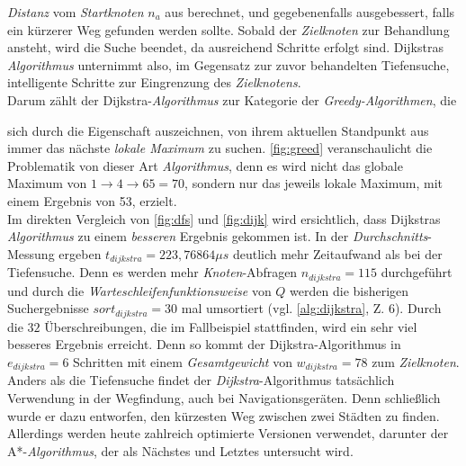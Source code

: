 \documentclass[12pt]{article}
\begin{document}
\noindent \textit{Distanz} vom \textit{Startknoten} $n_a$ aus berechnet, und gegebenenfalls ausgebessert, falls ein kürzerer Weg gefunden werden sollte. Sobald der \textit{Zielknoten} zur Behandlung ansteht, wird die Suche beendet, da ausreichend Schritte erfolgt sind. Dijkstras \textit{Algorithmus} unternimmt also, im Gegensatz zur zuvor behandelten Tiefensuche, intelligente Schritte zur Eingrenzung des \textit{Zielknotens}. 
\\
Darum zählt der Dijkstra-\textit{Algorithmus} zur Kategorie der \textit{Greedy-Algorithmen}, die

\noindent sich durch die Eigenschaft auszeichnen, von ihrem aktuellen Standpunkt aus immer das  nächste \textit{lokale Maximum} zu suchen. \autoref{fig:greed} veranschaulicht die Problematik von dieser Art \textit{Algorithmus}, denn es wird nicht das globale Maximum von $1 \to 4 \to 65 = 70$, sondern nur das jeweils lokale Maximum, mit einem Ergebnis von 53, erzielt.
\\
Im direkten Vergleich von \autoref{fig:dfs} und \autoref{fig:dijk} wird ersichtlich, dass Dijkstras \textit{Algorithmus} zu einem \textit{besseren} Ergebnis gekommen ist. In der \textit{Durchschnitts}-Messung ergeben $t_{dijkstra} = 223,76864\mu s$ deutlich mehr Zeitaufwand als bei der Tiefensuche. Denn es werden mehr \textit{Knoten}-Abfragen $n_{dijkstra} = 115$ durchgeführt und durch die \textit{Warteschleifenfunktionsweise} von $Q$ werden die bisherigen Suchergebnisse $sort_{dijkstra} = 30$ mal umsortiert (vgl. \autoref{alg:dijkstra}, Z. 6). Durch die $32$ Überschreibungen, die im Fallbeispiel stattfinden, wird ein sehr viel besseres Ergebnis erreicht. Denn so kommt der Dijkstra-Algorithmus in $e_{dijkstra} = 6$ Schritten mit einem \textit{Gesamtgewicht} von $w_{dijkstra} = 78$ zum \textit{Zielknoten}.
\\
Anders als die Tiefensuche findet der \textit{Dijkstra}-Algorithmus tatsächlich Verwendung in der Wegfindung, auch bei Navigationsgeräten. Denn schließlich wurde er dazu entworfen, den kürzesten Weg zwischen zwei Städten zu finden. Allerdings werden heute zahlreich optimierte Versionen verwendet, darunter der A*-\textit{Algorithmus}, der als Nächstes und Letztes untersucht wird.
\end{document}
